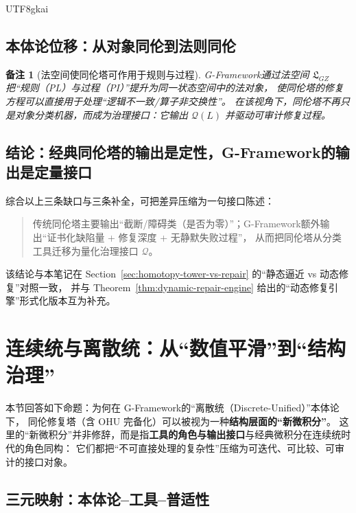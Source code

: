 \documentclass[12pt]{article}
\newtheorem{remark}{备注}[section]
\newcommand{\GFramework}{\textsf{G-Framework}}
\begin{document}
\begin{CJK*}{UTF8}{gkai}
\subsection{本体论位移：从对象同伦到法则同伦}

\begin{remark}[法空间使同伦塔可作用于规则与过程]\label{rem:lawspace-homotopy-tower}
\GFramework 通过法空间 $\mathfrak{L}_{GZ}$ 把“规则（PL）与过程（PI）”提升为同一状态空间中的法对象，
使同伦塔的修复方程可以直接用于处理“逻辑不一致/算子非交换性”。
在该视角下，同伦塔不再只是对象分类机器，而成为治理接口：它输出 $\mathcal{Q}(L)$ 并驱动可审计修复过程。%
\cite{HomotopyMinimalityDialogue,GaoZheng2025GFramework}
\end{remark}

\subsection{结论：经典同伦塔的输出是定性，\GFramework 的输出是定量接口}

综合以上三条缺口与三条补全，可把差异压缩为一句接口陈述：
\begin{quote}
传统同伦塔主要输出“截断/障碍类（是否为零）”；\GFramework 额外输出“证书化缺陷量 + 修复深度 + 无静默失败过程”，
从而把同伦塔从分类工具迁移为量化治理接口 $\mathcal{Q}$。%
\end{quote}
该结论与本笔记在 Section~\ref{sec:homotopy-tower-vs-repair} 的“静态逼近 vs 动态修复”对照一致，
并与 Theorem~\ref{thm:dynamic-repair-engine} 给出的“动态修复引擎”形式化版本互为补充。%
\cite{HomotopyMinimalityDialogue,GaoZheng2025GFramework,JacGapDStructureEquiv}

\section{连续统与离散统：从“数值平滑”到“结构治理”}
\label{sec:continuum-vs-discrete-unified}

本节回答如下命题：为何在 \GFramework 的“离散统（Discrete-Unified）”本体论下，
同伦修复塔（含 OHU 完备化）可以被视为一种\textbf{结构层面的“新微积分”}。
这里的“新微积分”并非修辞，而是指\textbf{工具的角色与输出接口}与经典微积分在连续统时代的角色同构：
它们都把“不可直接处理的复杂性”压缩为可迭代、可比较、可审计的接口对象。\cite{HomotopyMinimalityDialogue,GaoZheng2025GFramework}

\subsection{三元映射：本体论--工具--普适性}


\end{CJK*}
\end{document}
